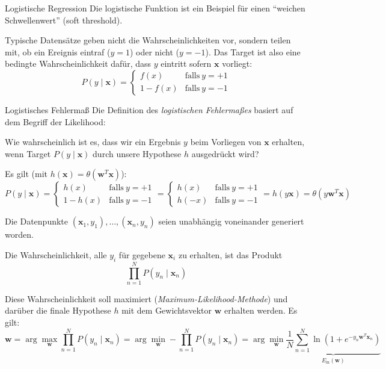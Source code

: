\begin{defi}{Logistische Regression}
    Die logistische Funktion ist ein Beispiel für einen \enquote{weichen Schwellenwert} (soft threshold).

    Typische Datensätze geben nicht die Wahrscheinlichkeiten vor, sondern teilen mit, ob ein Ereignis eintraf ($y = 1$) oder nicht ($y = -1$).
    Das Target ist also eine bedingte Wahrscheinlichkeit dafür, dass $y$ eintritt sofern $\mathbf{x}$ vorliegt:
    \[
        P(y \mid \mathbf{x}) = \begin{cases}
            f(x)     & \text{falls} \ y = +1 \\
            1 - f(x) & \text{falls} \ y = -1
        \end{cases}
    \]
\end{defi}

\begin{defi}{Logistisches Fehlermaß}
    Die Definition des \emph{logistischen Fehlermaßes} basiert auf dem Begriff der Likelihood:

    Wie wahrscheinlich ist es, dass wir ein Ergebnis $y$ beim Vorliegen von $\mathbf{x}$ erhalten, wenn Target $P(y \mid \mathbf{x})$ durch unsere Hypothese $h$ ausgedrückt wird?

    Es gilt (mit $h(\mathbf{x}) = \theta(\mathbf{w}^T \mathbf{x})$):
    \[
        P(y \mid \mathbf{x}) = \begin{cases}
            h(x)     & \text{falls} \ y = +1 \\
            1 - h(x) & \text{falls} \ y = -1
        \end{cases}
        = \begin{cases}
            h(x)  & \text{falls} \ y = +1 \\
            h(-x) & \text{falls} \ y = -1
        \end{cases}
        = h(y \mathbf{x}) = \theta (y \mathbf{w}^T \mathbf{x})
    \]

    Die Datenpunkte $(\mathbf{x}_1, y_1), \ldots, (\mathbf{x}_n, y_n)$ seien unabhängig voneinander generiert worden.

    Die Wahrscheinlichkeit, alle $y_i$ für gegebene $\mathbf{x}_i$ zu erhalten, ist das Produkt
    \[
        \prod_{n=1}^N P(y_n \mid \mathbf{x}_n)
    \]

    Diese Wahrscheinlichkeit soll maximiert (\emph{Maximum-Likelihood-Methode}) und darüber die finale Hypothese $h$ mit dem Gewichtsvektor $\mathbf{w}$ erhalten werden.
    Es gilt:
    \[
        \mathbf{w} = \arg\max_{\mathbf{w}} \prod_{n=1}^N P(y_n \mid \mathbf{x}_n) = \arg\min_{\mathbf{w}} -\prod_{n=1}^N P(y_n \mid \mathbf{x}_n) = \arg\min_{\mathbf{w}} \underbrace{\frac{1}{N} \sum_{n=1}^N \ln \left( 1 + e^{-y_n \mathbf{w}^T \mathbf{x}_n} \right)}_{E_\text{in}(\mathbf{w})}
    \]


\end{defi}
